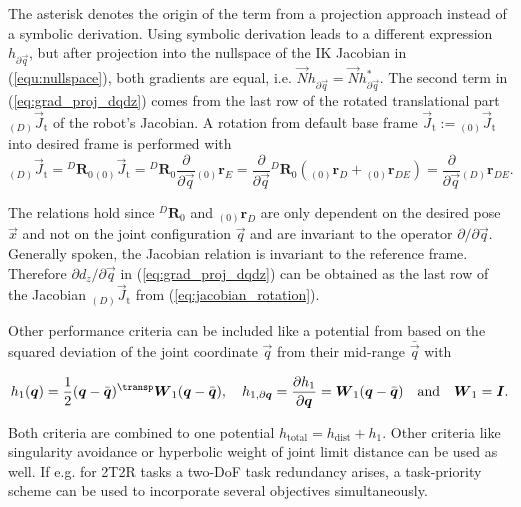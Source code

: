 \documentclass[graybox,vecphys]{svmult}
\newcommand{\rotmat}[2]{{{ }^{#1}\boldsymbol{R}}_{#2}}
\newcommand{\ortvek}[4]{{ }_{(#1)}{\boldsymbol{#2}}^{#3}_{#4} }
\begin{document}
The asterisk denotes the origin of the term from a projection approach instead of a symbolic derivation.
Using symbolic derivation leads to a different expression $h_{\partial \vec{q}}$, but after projection into the nullspace of the IK Jacobian in (\ref{equ:nullspace}), both gradients are equal, i.e. $\vec{N} h_{\partial \vec{q}}=\vec{N} h_{\partial \vec{q}}^{*} $.
The second term in (\ref{eq:grad_proj_dqdz}) comes from the last row of the rotated translational part ${_{(D)}\vec{J}_\mathrm{t}}$ of the robot's Jacobian.
A rotation from default base frame $\vec{J}_\mathrm{t}{:=}{_{(0)}\vec{J}_\mathrm{t}}$ into desired frame is performed with
\begin{equation}
{_{(D)}\vec{J}_\mathrm{t}} 
= 
\rotmat{D}{0} {_{(0)}\vec{J}_\mathrm{t}}
=
\rotmat{D}{0}
\frac{\partial}{\partial \vec{q}} \ortvek{0}{r}{}{E}
=
\frac{\partial}{\partial \vec{q}} 
\rotmat{D}{0}
(\ortvek{0}{r}{}{D} {+} \ortvek{0}{r}{}{DE})
=
\frac{\partial}{\partial \vec{q}} \ortvek{D}{r}{}{DE}.
\label{eq:jacobian_rotation}
\end{equation}

The relations hold since $\rotmat{D}{0}$ and $\ortvek{0}{r}{}{D}$ are only dependent on the desired pose $\vec{x}$ and not on the joint configuration $\vec{q}$ and are invariant to the operator $\partial/\partial \vec{q}$.
Generally spoken, the Jacobian relation is invariant to the reference frame.
Therefore $\partial d_z / \partial \vec{q}$ in (\ref{eq:grad_proj_dqdz}) can be obtained as the last row of the Jacobian ${_{(D)}\vec{J}_\mathrm{t}}$ from (\ref{eq:jacobian_rotation}).

Other performance criteria can be included like a potential from \cite{HuoBar2008} based on the squared deviation of the joint coordinate $\vec{q}$ from their mid-range $\bar{\vec{q}}$ with

\begin{equation}
h_1(\vec{q})
=
\frac{1}{2} (\vec{q}-\bar{\vec{q}})^\transp\vec{W}_1(\vec{q}-\bar{\vec{q}}),
\quad
h_{1,\partial\vec{q}}
=
\frac{\partial h_1}{\partial \vec{q}}
=
\vec{W}_1(\vec{q}-\bar{\vec{q}}) 
\quad \mathrm{and} \quad \vec{W}_1=\vec{I}.
\label{equ:h_qlim_par}
\end{equation}

Both criteria are combined to one potential $h_{\mathrm{total}}=h_{\mathrm{dist}} + h_1$.
Other criteria like singularity avoidance \cite{HuoBar2008} or hyperbolic weight of joint limit distance \cite{ZhuQuCaoYan2013} can be used as well.
If e.g. for 2T2R tasks a two-DoF task redundancy arises, a task-priority scheme \cite{MoeAntTee2016} can be used to incorporate several objectives simultaneously.
\end{document}
